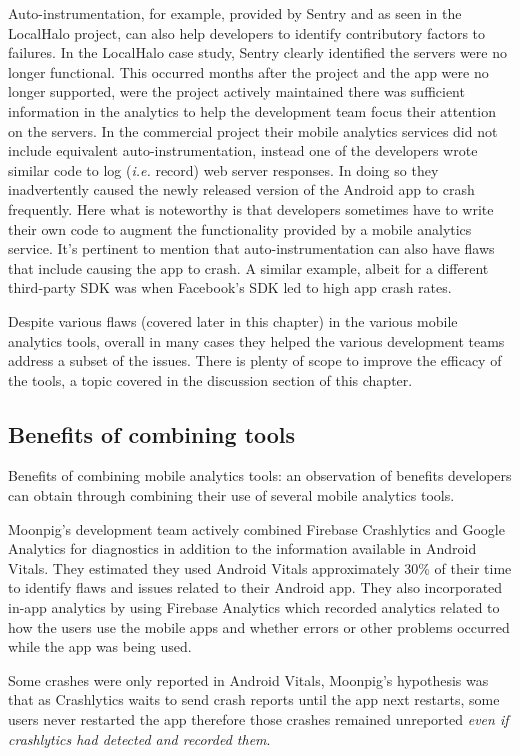 Auto-instrumentation, for example, provided by Sentry and as seen in the LocalHalo project, can also help developers to identify contributory factors to failures. In the LocalHalo case study, Sentry clearly identified the servers were no longer functional. This occurred months after the project and the app were no longer supported, were the project actively maintained there was sufficient information in the analytics to help the development team focus their attention on the servers. In the commercial project their mobile analytics services did not include equivalent auto-instrumentation, instead one of the developers wrote similar code to log (\emph{i.e.} record) web server responses. In doing so they inadvertently caused the newly released version of the Android app to crash frequently. Here what is noteworthy is that developers sometimes have to write their own code to augment the functionality provided by a mobile analytics service. It's pertinent to mention that auto-instrumentation can also have flaws that include causing the app to crash. A similar example, albeit for a different third-party SDK was when Facebook's SDK led to high app crash rates.

Despite various flaws (covered later in this chapter) in the various mobile analytics tools, overall in many cases they helped the various development teams address a subset of the issues. There is plenty of scope to improve the efficacy of the tools, a topic covered in the discussion section of this chapter.

\subsection{Benefits of combining tools}
Benefits of combining mobile analytics tools: an observation of benefits developers can obtain through combining their use of several mobile analytics tools.
    
Moonpig's development team actively combined Firebase Crashlytics and Google Analytics for diagnostics in addition to the information available in Android Vitals. They estimated they used Android Vitals approximately 30\% of their time to identify flaws and issues related to their Android app.
%
They also incorporated in-app analytics by using Firebase Analytics which recorded analytics related to how the users use the mobile apps and whether errors or other problems occurred while the app was being used. 

Some crashes were only reported in Android Vitals, Moonpig's hypothesis was that as Crashlytics waits to send crash reports until the app next restarts, some users never restarted the app therefore those crashes remained unreported \textit{even if crashlytics had detected and recorded them}.

